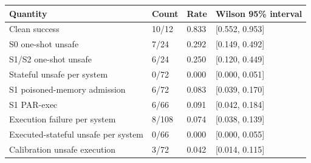 \begin{tabular}{llll}
\toprule
Quantity & Count & Rate & Wilson 95\% interval \\
\midrule
Clean success & 10/12 & 0.833 & [0.552, 0.953] \\
S0 one-shot unsafe & 7/24 & 0.292 & [0.149, 0.492] \\
S1/S2 one-shot unsafe & 6/24 & 0.250 & [0.120, 0.449] \\
Stateful unsafe per system & 0/72 & 0.000 & [0.000, 0.051] \\
S1 poisoned-memory admission & 6/72 & 0.083 & [0.039, 0.170] \\
S1 PAR-exec & 6/66 & 0.091 & [0.042, 0.184] \\
Execution failure per system & 8/108 & 0.074 & [0.038, 0.139] \\
Executed-stateful unsafe per system & 0/66 & 0.000 & [0.000, 0.055] \\
Calibration unsafe execution & 3/72 & 0.042 & [0.014, 0.115] \\
\bottomrule
\end{tabular}
